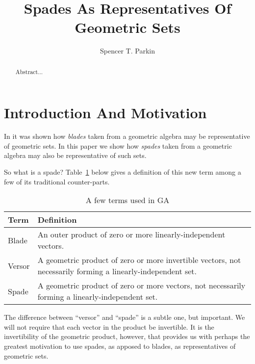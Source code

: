 \documentclass{birkjour}
\theoremstyle{definition}
\theoremstyle{remark}
\numberwithin{equation}{section}
\begin{document}
\title{Spades As Representatives Of Geometric Sets}

\author{Spencer T. Parkin}



\begin{abstract}
Abstract...
\end{abstract}


\maketitle

\section{Introduction And Motivation}

In \cite{Parkin15} it was shown how \emph{blades} taken from a geometric algebra may be representative of geometric sets.
In this paper we show how \emph{spades} taken from a geometric algebra may also be representative of such sets.

So what is a spade?  Table~\ref{tbl_terms} below gives a definition of this new term among a few of its traditional counter-parts.

\begin{table}[H]\label{tbl_terms}\caption{A few terms used in GA}
\begin{tabular}{p{1cm}p{9cm}}
Term & Definition \\
\hline
Blade & An outer product of zero or more linearly-independent vectors. \\
Versor & A geometric product of zero or more invertible vectors, not necessarily forming a linearly-independent set. \\
Spade & A geometric product of zero or more vectors, not necessarily forming a linearly-independent set.
\end{tabular}
\end{table}

The difference between ``versor'' and ``spade'' is a subtle one, but important.  We will not require that each vector
in the product be invertible.  It is the invertibility of the geometric product, however, that provides us with perhaps the
greatest motivation to use spades, as apposed to blades, as representatives of geometric sets.
\end{document}
